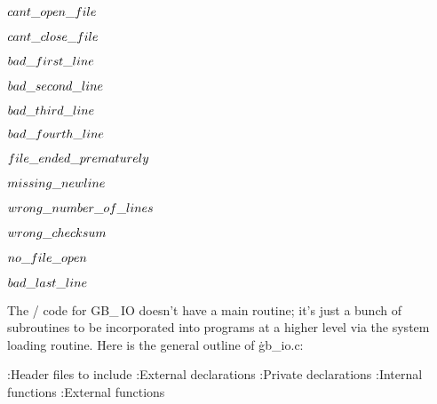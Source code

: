 \Y\B\4\D$\\{cant\_open\_file}$ \5
\par
\B\4\D$\\{cant\_close\_file}$ \5
\par
\B\4\D$\\{bad\_first\_line}$ \5
\par
\B\4\D$\\{bad\_second\_line}$ \5
\par
\B\4\D$\\{bad\_third\_line}$ \5
\par
\B\4\D$\\{bad\_fourth\_line}$ \5
\par
\B\4\D$\\{file\_ended\_prematurely}$ \5
\par
\B\4\D$\\{missing\_newline}$ \5
\par
\B\4\D$\\{wrong\_number\_of\_lines}$ \5
\par
\B\4\D$\\{wrong\_checksum}$ \5
\par
\B\4\D$\\{no\_file\_open}$ \5
\par
\B\4\D$\\{bad\_last\_line}$ \5
\par
\fi

The \CEE/ code for {\sc GB\_\,IO} doesn't have a main routine; it's just a
bunch of subroutines to be incorporated into programs at a higher level
via the system loading routine. Here is the general outline of \.{gb\_io.c}:

\Y\B{}:Header files to include\X\6
\ATH\6
:External declarations\X\6
:Private declarations\X\6
:Internal functions\X\6
:External functions\X\par
\fi

